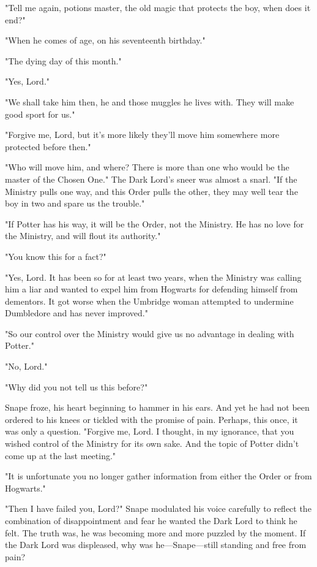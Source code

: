 "Tell me again, potions master, the old magic that protects the boy, when does it end?"

"When he comes of age, on his seventeenth birthday."

"The dying day of this month."

"Yes, Lord."

"We shall take him then, he and those muggles he lives with. They will make good sport for us."

"Forgive me, Lord, but it's more likely they'll move him somewhere more protected before then."

"Who will move him, and where? There is more than one who would be the master of the Chosen One." The Dark Lord's sneer was almost a snarl. "If the Ministry pulls one way, and this Order pulls the other, they may well tear the boy in two and spare us the trouble."

"If Potter has his way, it will be the Order, not the Ministry. He has no love for the Ministry, and will flout its authority."

"You know this for a fact?"

"Yes, Lord. It has been so for at least two years, when the Ministry was calling him a liar and wanted to expel him from Hogwarts for defending himself from dementors. It got worse when the Umbridge woman attempted to undermine Dumbledore and has never improved."

"So our control over the Ministry would give us no advantage in dealing with Potter."

"No, Lord."

"Why did you not tell us this before?"

Snape froze, his heart beginning to hammer in his ears. And yet he had not been ordered to his knees or tickled with the promise of pain. Perhaps, this once, it was only a question. "Forgive me, Lord. I thought, in my ignorance, that you wished control of the Ministry for its own sake. And the topic of Potter didn't come up at the last meeting."

"It is unfortunate you no longer gather information from either the Order or from Hogwarts."

"Then I have failed you, Lord?" Snape modulated his voice carefully to reflect the combination of disappointment and fear he wanted the Dark Lord to think he felt. The truth was, he was becoming more and more puzzled by the moment. If the Dark Lord was displeased, why was he—Snape—still standing and free from pain?


